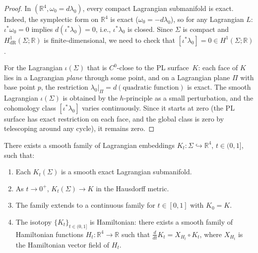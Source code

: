 \begin{proof}
In $(\mathbb{R}^4, \omega_0 = d\lambda_0)$, every compact Lagrangian
submanifold is exact. Indeed, the symplectic form on $\mathbb{R}^4$ is
exact ($\omega_0 = -d\lambda_0$), so for any Lagrangian $L$:
$\iota^*\omega_0 = 0$ implies $d(\iota^*\lambda_0) = 0$, i.e.,
$\iota^*\lambda_0$ is closed. Since $\Sigma$ is compact and
$H^1_{\mathrm{dR}}(\Sigma;\mathbb{R})$ is finite-dimensional, we need to
check that $[\iota^*\lambda_0]=0\in H^1(\Sigma;\mathbb{R})$.

For the Lagrangian $\iota(\Sigma)$ that is $C^0$-close to the PL surface~$K$:
each face of $K$ lies in a Lagrangian \emph{plane} through some point, and
on a Lagrangian plane $\Pi$ with base point $p$, the restriction
$\lambda_0|_\Pi = d(\text{quadratic function})$ is exact. The smooth
Lagrangian $\iota(\Sigma)$ is obtained by the $h$-principle as a small
perturbation, and the cohomology class $[\iota^*\lambda_0]$ varies
continuously. Since it starts at zero (the PL surface has exact restriction
on each face, and the global class is zero by telescoping around any cycle),
it remains zero.
\end{proof}

\begin{theorem}
\label{thm:p8-moser}
There exists a smooth family of Lagrangian embeddings
$K_t: \Sigma\hookrightarrow\mathbb{R}^4$, $t\in(0,1]$, such that:
\begin{enumerate}
\item[(a)] Each $K_t(\Sigma)$ is a smooth exact Lagrangian submanifold.
\item[(b)] As $t\to 0^+$, $K_t(\Sigma)\to K$ in the Hausdorff metric.
\item[(c)] The family extends to a continuous family for $t\in[0,1]$ with
$K_0 = K$.
\item[(d)] The isotopy $\{K_t\}_{t\in(0,1]}$ is Hamiltonian: there exists
a smooth family of Hamiltonian functions $H_t: \mathbb{R}^4\to\mathbb{R}$
such that $\frac{d}{dt}K_t = X_{H_t}\circ K_t$, where $X_{H_t}$ is the
Hamiltonian vector field of $H_t$.
\end{enumerate}
\end{theorem}


